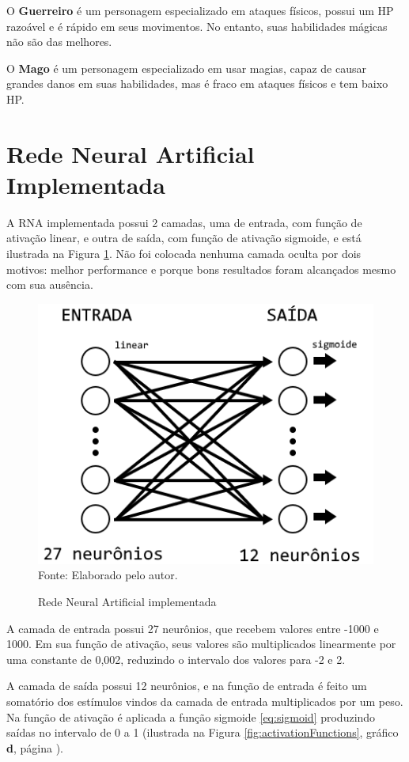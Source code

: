 \documentclass[
	12pt,					%
	openright,				%
	oneside,				%
	a4paper,				%
	bibjustif,				%
	chapter=TITLE,			%
	english,				%
	brazil,					%
	]{abntex2}
\newcommand{\source}[1]{\small Fonte: {#1}}
\begin{document}
	O \textbf{Guerreiro} é um personagem especializado em ataques físicos,
	possui um HP razoável e é rápido em seus movimentos.
	No entanto, suas habilidades mágicas não são das melhores.
	
	O \textbf{Mago} é um personagem especializado em usar magias,
	capaz de causar grandes danos em suas habilidades,
	mas é fraco em ataques físicos e tem baixo HP.
	
	\FloatBarrier
	\section{Rede Neural Artificial Implementada}
	A RNA implementada possui 2 camadas,
	uma de entrada, com função de ativação linear,
	e outra de saída, com função de ativação sigmoide,
	e está ilustrada na Figura \ref{fig:gameNN}.
	Não foi colocada nenhuma camada oculta por dois motivos:
	melhor performance e
	porque bons resultados foram alcançados mesmo com sua ausência.
	
	\begin{figure}[ht!]
		\centering
		\caption{Rede Neural Artificial implementada}
		\includegraphics[scale=0.9]{img/GameNN.png}\\
		\vspace{0.5mm}
		\source{Elaborado pelo autor.}
		\label{fig:gameNN}
	\end{figure}
	
	A camada de entrada possui 27 neurônios,
	que recebem valores entre -1000 e 1000.
	Em sua função de ativação,
	seus valores são multiplicados linearmente por uma constante de 0,002,
	reduzindo o intervalo dos valores para -2 e 2.
	
	A camada de saída possui 12 neurônios,
	e na função de entrada é feito um somatório dos estímulos vindos da camada de entrada multiplicados por um peso.
	Na função de ativação é aplicada a função sigmoide \eqref{eq:sigmoid}
	produzindo saídas no intervalo de 0 a 1
	(ilustrada na Figura \ref{fig:activationFunctions},
	gráfico \textbf{d},
	página \pageref{fig:activationFunctions}).
	
\end{document}
